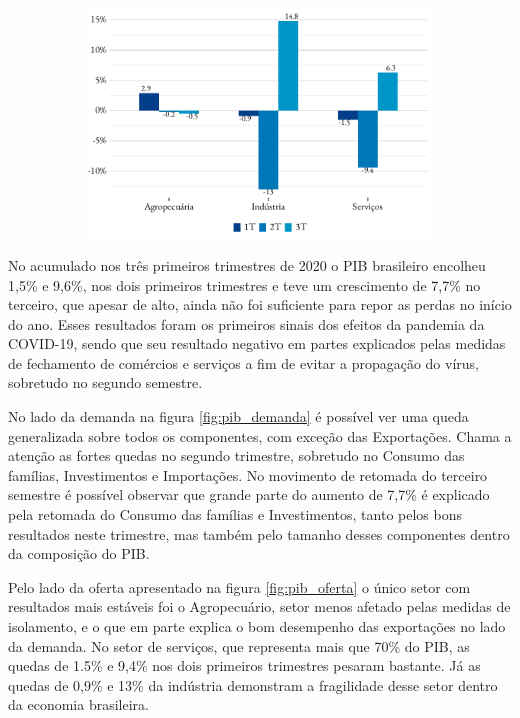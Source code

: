 \begin{figure}[!h]
\begin{subfigure}{\linewidth}
		\includegraphics{fig/pib_oferta.pdf}
	\end{subfigure}
\end{figure}
\par No acumulado nos três primeiros trimestres de 2020 o PIB brasileiro encolheu 1,5\% e 9,6\%, nos dois primeiros trimestres e teve um crescimento de 7,7\% no terceiro, que apesar de alto, ainda não foi suficiente para repor as perdas no início do ano. Esses resultados foram os primeiros sinais dos efeitos da pandemia da COVID-19, sendo que seu resultado negativo em partes explicados pelas medidas de fechamento de comércios e serviços a fim de evitar a propagação do vírus, sobretudo no segundo semestre.
\par No lado da demanda na figura \ref{fig:pib_demanda} é possível ver uma queda generalizada sobre todos os componentes, com exceção das Exportações. Chama a atenção as fortes quedas no segundo trimestre, sobretudo no Consumo das famílias, Investimentos e Importações. No movimento de retomada do terceiro semestre é possível observar que grande parte do aumento de 7,7\% é explicado pela retomada do Consumo das famílias e Investimentos, tanto pelos bons resultados neste trimestre, mas também pelo tamanho desses componentes dentro da composição do PIB.
\par Pelo lado da oferta apresentado na figura \ref{fig:pib_oferta} o único setor com resultados mais estáveis foi o Agropecuário, setor menos afetado pelas medidas de isolamento, e o que em parte explica o bom desempenho das exportações no lado da demanda. No setor de serviços, que representa mais que 70\% do PIB, as quedas de 1.5\% e 9,4\% nos dois primeiros trimestres pesaram bastante. Já as quedas de 0,9\% e 13\% da indústria demonstram a fragilidade desse setor dentro da economia brasileira.

